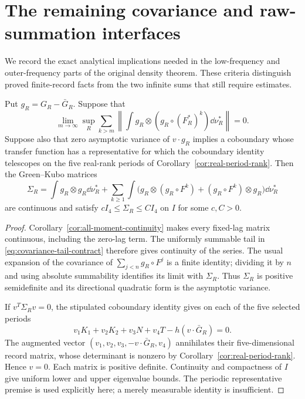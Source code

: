 \section{The remaining covariance and raw-summation interfaces}
\label{sec:closure-contracts}
We record the exact analytical implications needed in the low-frequency
and outer-frequency parts of the original density theorem. These
criteria distinguish proved finite-record facts from the two infinite
sums that still require estimates.

\begin{proposition}
\label{prop:covariance-closure}
Put $g_R=G_R-\bar G_R$. Suppose that
\begin{equation}\label{eq:covariance-tail-contract}
 \lim_{m\to\infty}\sup_R\sum_{k>m}
       \left\|\int g_R\otimes(g_R\circ(F_R^*)^k)\dd\nu_R^*\right\|=0.
\end{equation}
Suppose also that zero asymptotic variance of $v\cdot g_R$ implies a
coboundary whose transfer function has a representative for which the
coboundary identity telescopes on the five real-rank periods of
Corollary~\ref{cor:real-period-rank}. Then the Green--Kubo matrices
\[
 \Sigma_R=\int g_R\otimes g_R\dd\nu_R^*
  +\sum_{k\ge1}\int\bigl(g_R\otimes(g_R\circ F^k)
                    +(g_R\circ F^k)\otimes g_R\bigr)\dd\nu_R^*
\]
are continuous and satisfy $cI_4\le\Sigma_R\le CI_4$ on $I$ for some
$c,C>0$.
\end{proposition}
\begin{proof}
Corollary~\ref{cor:all-moment-continuity} makes every fixed-lag matrix
continuous, including the zero-lag term. The uniformly summable tail in
\eqref{eq:covariance-tail-contract} therefore gives continuity of the
series. The usual expansion of the covariance of $\sum_{j<n}g_R\circ F^j$
is a finite identity; dividing it by $n$ and using absolute summability
identifies its limit with $\Sigma_R$. Thus $\Sigma_R$ is positive
semidefinite and its directional quadratic form is the asymptotic
variance.

If $v^T\Sigma_Rv=0$, the stipulated coboundary identity gives on each of
the five selected periods
\[
 v_1K_1+v_2K_2+v_3N+v_4T-h(v\cdot\bar G_R)=0.
\]
The augmented vector $(v_1,v_2,v_3,-v\cdot\bar G_R,v_4)$ annihilates
their five-dimensional record matrix, whose determinant is nonzero by
Corollary~\ref{cor:real-period-rank}. Hence $v=0$. Each matrix is
positive definite. Continuity and compactness of $I$ give uniform lower
and upper eigenvalue bounds. The periodic representative premise is
used explicitly here; a merely measurable identity is insufficient.
\end{proof}

